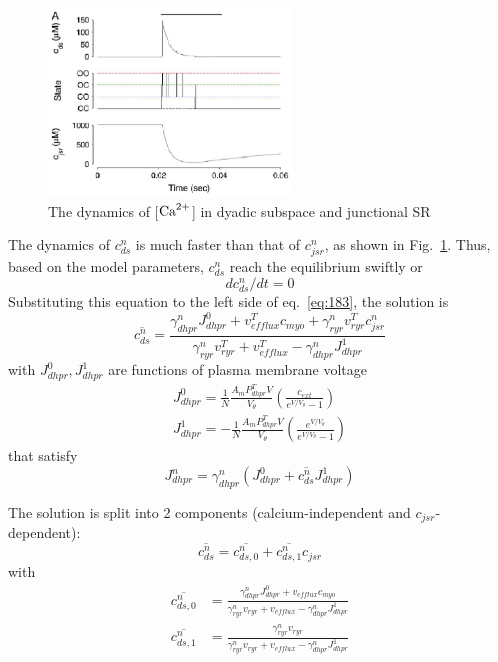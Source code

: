 \begin{figure}[hbt]
 \centerline{\includegraphics[height=5cm]{./images/Ca_ds_jsr.eps}}
\caption{The dynamics of [${\text{Ca}^{2+}}$] in dyadic subspace and
  junctional SR}
\label{fig:Ca_ds_jsr}
\end{figure}

The dynamics of $c^n_{ds}$ is much faster than that of $c^n_{jsr}$, as
shown in Fig.~\ref{fig:Ca_ds_jsr}. Thus, based on the model
parameters, $c^n_{ds}$ reach the equilibrium swiftly or
\begin{equation}
  \label{eq:210}
  dc^n_{ds}/dt  = 0
\end{equation}
Substituting this equation to the left side of eq.~\eqref{eq:183}, the
solution is
\begin{equation}
  \label{eq:220}
  \overline{c^n_{ds}} = \frac{\gamma^n_{dhpr}J^0_{dhpr}+v^T_{efflux}c_{myo}+\gamma^n_{ryr}v^T_{ryr}c^n_{jsr}}{\gamma^n_{ryr} v^T_{ryr} + v^T_{efflux}
      - \gamma^n_{dhpr}J^1_{dhpr}}
\end{equation}
with $J^0_{dhpr}, J^1_{dhpr}$ are functions of plasma membrane voltage
\begin{equation}
  \label{eq:221}
    \begin{split}
    J^0_{dhpr} = \frac{1}{N} \frac{A_mP^T_{dhpr}V}{V_\theta} \left( \frac{c_{ext}}{e^{V/V_\theta}-1}  \right)\\
    J^1_{dhpr} =  -\frac{1}{N} \frac{A_mP^T_{dhpr}V}{V_\theta} \left( \frac{e^{V/V_\theta}}{e^{V/V_\theta}-1}  \right)
  \end{split}
\end{equation}
that satisfy
\begin{equation}
  \label{eq:2082}
  J^n_{dhpr} =   \gamma^n_{dhpr} (J^0_{dhpr} + \overline{c^n_{ds}}  J^1_{dhpr})
\end{equation}

The solution is split into 2 components (calcium-independent and
$c_{jsr}$-dependent):
\begin{equation}
  \label{eq:2051}
  \overline{c^n_{ds}} =   \overline{c^n_{ds,0}} +  \overline{c^n_{ds,1}}  c_{jsr}
\end{equation}
with
\begin{equation}
  \label{eq:2061}
  \begin{split}
      \overline{c^n_{ds,0}} &= \frac{\gamma^n_{dhpr}J^0_{dhpr} +
        v_{efflux}c_{myo}}{\gamma^n_{ryr} v_{ryr} + v_{efflux} - \gamma^n_{dhpr}J^1_{dhpr}} \\
      \overline{c^n_{ds,1}} &=
      \frac{\gamma^n_{ryr}v_{ryr}}{\gamma^n_{ryr} v_{ryr} + v_{efflux}
      - \gamma^n_{dhpr}J^1_{dhpr}} \\
  \end{split}
\end{equation}


